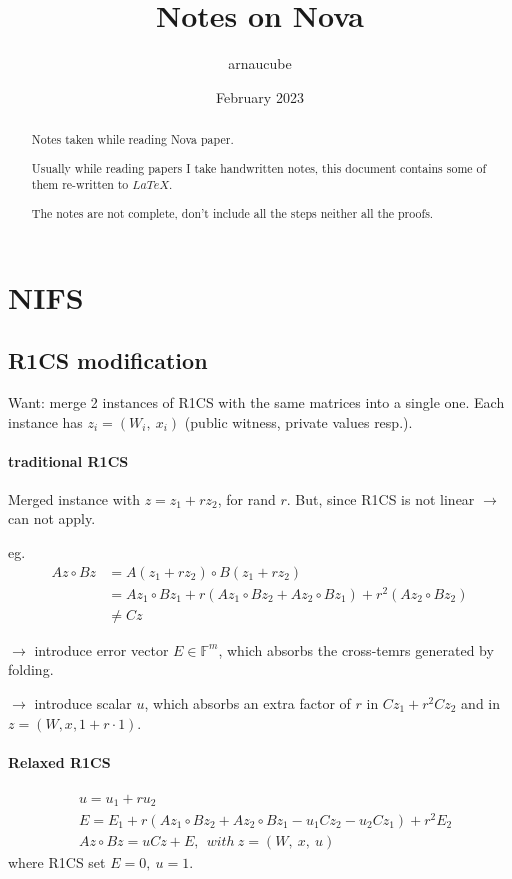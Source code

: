 \documentclass{article}
\title{Notes on Nova}
\author{arnaucube}
\date{February 2023}
\theoremstyle{definition}
\begin{document}
\maketitle

\begin{abstract}
	Notes taken while reading Nova \cite{cryptoeprint:2021/370} paper.

	Usually while reading papers I take handwritten notes, this document contains some of them re-written to $LaTeX$.

	The notes are not complete, don't include all the steps neither all the proofs.
\end{abstract}

\tableofcontents

\section{NIFS}

\subsection{R1CS modification}

Want: merge 2 instances of R1CS with the same matrices into a single one. Each instance has $z_i = (W_i,~ x_i)$ (public witness, private values resp.).

\paragraph{traditional R1CS}
Merged instance with $z=z_1 + r z_2$, for rand $r$. But, since R1CS is not linear $\longrightarrow$ can not apply.

eg.
\begin{align*}
	Az \circ Bz &= A(z_1 + r z_2) \circ B (z_1 + r z_2)\\
	&= A z_1 \circ B z_1 + r(A z_1 \circ B z_2 + A z_2 \circ B z_1) + r^2 (A z_2 \circ B z_2)\\
	&\neq Cz
\end{align*}

$\longrightarrow$ introduce error vector $E \in \mathbb{F}^m$, which absorbs the cross-temrs generated by folding.

$\longrightarrow$ introduce scalar $u$, which absorbs an extra factor of $r$ in $C z_1 + r^2 C z_2$ and in $z=(W, x, 1+r\cdot 1)$.

\paragraph{Relaxed R1CS}
\begin{align*}
	&u=u_1+r u_2\\
	&E=E_1 + r (A z_1 \circ B z_2 + A z_2 \circ B z_1 - u_1 C z_2 - u_2 C z_1) + r^2 E_2\\
	&Az \circ Bz = uCz + E,~~ with~ z=(W,~x,~u)
\end{align*}
where R1CS set $E=0,~u=1$.
\end{document}
